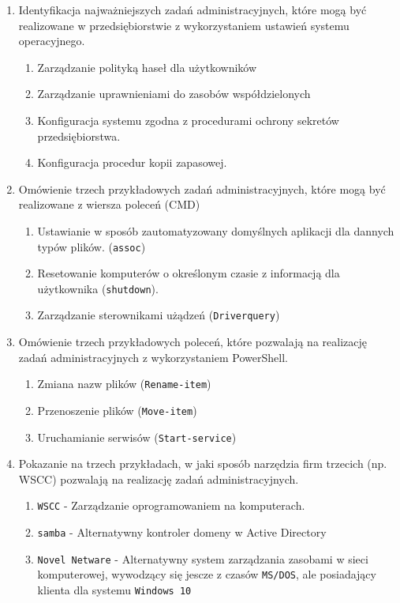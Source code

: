 \documentclass[12pt,a4paper]{article}
\begin{document}
\begin{enumerate}
    \item Identyfikacja najważniejszych zadań administracyjnych, które mogą być
        realizowane w przedsiębiorstwie z wykorzystaniem ustawień systemu
        operacyjnego.  \begin{enumerate}
            \item Zarządzanie polityką haseł dla użytkowników
            \item Zarządzanie uprawnieniami do zasobów współdzielonych
            \item Konfiguracja systemu zgodna z procedurami ochrony sekretów 
                przedsiębiorstwa.
            \item Konfiguracja procedur kopii zapasowej.
    \end{enumerate}
    \item Omówienie trzech przykładowych zadań administracyjnych, które mogą
        być realizowane z wiersza poleceń (CMD) \begin{enumerate}
            \item Ustawianie w sposób zautomatyzowany domyślnych aplikacji dla 
                dannych typów plików. (\texttt{assoc})
            \item Resetowanie komputerów o określonym czasie z informacją dla 
                użytkownika (\texttt{shutdown}).
            \item Zarządzanie sterownikami użądzeń (\texttt{Driverquery})
    \end{enumerate}
    \item Omówienie trzech przykładowych poleceń, które pozwalają na realizację
        zadań administracyjnych z wykorzystaniem PowerShell. \begin{enumerate}
            \item Zmiana nazw plików (\texttt{Rename-item})
            \item Przenoszenie plików (\texttt{Move-item})
            \item Uruchamianie serwisów (\texttt{Start-service})
    \end{enumerate}
    \item Pokazanie na trzech przykładach, w jaki sposób narzędzia firm
        trzecich (np. WSCC) pozwalają na realizację zadań administracyjnych.
        \begin{enumerate}
            \item \texttt{WSCC} - Zarządzanie oprogramowaniem na komputerach.
            \item \texttt{samba} - Alternatywny kontroler domeny w Active
                Directory
            \item \texttt{Novel Netware} - Alternatywny system zarządzania
                zasobami w sieci komputerowej, wywodzący się jescze z czasów
                \texttt{MS/DOS}, ale posiadający klienta dla systemu
                \texttt{Windows 10}
        \end{enumerate}
\end{enumerate}
\end{document}
